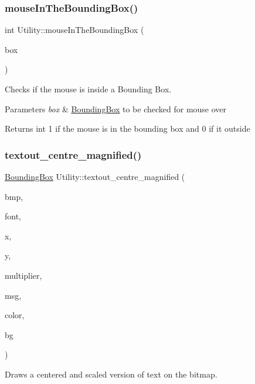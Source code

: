 \subsubsection{\texorpdfstring{mouseInTheBoundingBox()}{mouseInTheBoundingBox()}}
{\footnotesize\ttfamily int Utility\+::mouse\+In\+The\+Bounding\+Box (\begin{DoxyParamCaption}\item[{\mbox{\hyperlink{struct_bounding_box}{Bounding\+Box}}}]{box }\end{DoxyParamCaption})}



Checks if the mouse is inside a Bounding Box. 


\begin{DoxyParams}{Parameters}
{\em box} & \mbox{\hyperlink{struct_bounding_box}{Bounding\+Box}} to be checked for mouse over \\
\hline
\end{DoxyParams}
\begin{DoxyReturn}{Returns}
int 1 if the mouse is in the bounding box and 0 if it outside 
\end{DoxyReturn}
\mbox{\label{namespace_utility_aa945341a76a7ea64a3e4a472a20c8d45}} 
\subsubsection{\texorpdfstring{textout\_centre\_magnified()}{textout\_centre\_magnified()}}
{\footnotesize\ttfamily \mbox{\hyperlink{struct_bounding_box}{Bounding\+Box}} Utility\+::textout\+\_\+centre\+\_\+magnified (\begin{DoxyParamCaption}\item[{B\+I\+T\+M\+AP $\ast$}]{bmp,  }\item[{F\+O\+NT $\ast$}]{font,  }\item[{int}]{x,  }\item[{int}]{y,  }\item[{double}]{multiplier,  }\item[{const char $\ast$}]{msg,  }\item[{int}]{color,  }\item[{int}]{bg }\end{DoxyParamCaption})}



Draws a centered and scaled version of text on the bitmap. 


